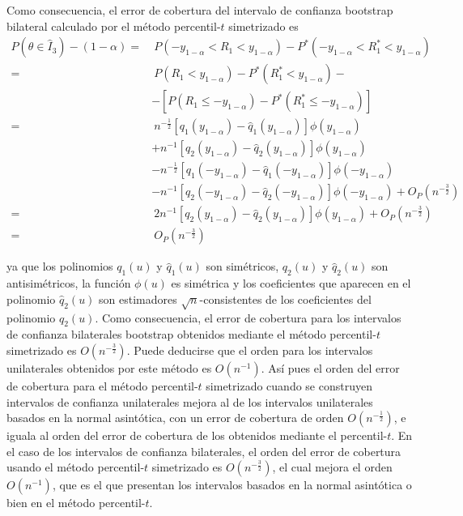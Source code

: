 \documentclass[]{book}
\theoremstyle{definition}
\theoremstyle{definition}
\theoremstyle{definition}
\theoremstyle{remark}
\begin{document}
Como consecuencia, el error de cobertura del intervalo de confianza
bootstrap bilateral calculado por el método percentil-\(t\) simetrizado
es \[\begin{aligned}
P\left( \theta \in \hat{I}_3 \right) -\left( 1-\alpha \right) 
=&\ P\left(-y_{1-\alpha }<R_1<y_{1-\alpha } \right) -P^{\ast}\left( -y_{1-\alpha
}<R_1^{\ast}<y_{1-\alpha } \right) \\
=&\ P\left( R_1<y_{1-\alpha } \right) -P^{\ast}\left( R_1^{\ast
}<y_{1-\alpha } \right) - \\
&-\left[ P\left( R_1\leq -y_{1-\alpha } \right) -P^{\ast}\left( R_1^{\ast
}\leq -y_{1-\alpha } \right) \right] \\
=&\ n^{-\frac{1}{2}}\left[ q_1\left( y_{1-\alpha } \right) -\hat{q}_1\left(
y_{1-\alpha } \right) \right] \phi \left( y_{1-\alpha } \right) \\
&+n^{-1}\left[ q_2\left( y_{1-\alpha } \right) -\hat{q}_2\left(
y_{1-\alpha } \right) \right] \phi \left( y_{1-\alpha } \right) \\
&-n^{-\frac{1}{2}}\left[ q_1\left( -y_{1-\alpha } \right) -\hat{q}_1\left(
-y_{1-\alpha } \right) \right] \phi \left( -y_{1-\alpha } \right) \\
&-n^{-1}\left[ q_2\left( -y_{1-\alpha } \right) -\hat{q}_2\left(
-y_{1-\alpha } \right) \right] \phi \left( -y_{1-\alpha } \right) +O_{P}\left(
n^{-\frac{3}{2}} \right) \\
=&\ 2n^{-1}\left[ q_2\left( y_{1-\alpha } \right) -\hat{q}_2\left(
y_{1-\alpha } \right) \right] \phi \left( y_{1-\alpha } \right) +O_{P}\left(
n^{-\frac{3}{2}} \right) \\
=&\ O_{P}\left( n^{-\frac{3}{2}} \right)
\end{aligned}\]

ya que los polinomios \(q_1\left( u \right)\) y
\(\hat{q}_1\left( u \right)\) son simétricos, \(q_2\left( u \right)\) y
\(\hat{q}_2\left( u \right)\) son antisimétricos, la función
\(\phi \left( u \right)\) es simétrica y los coeficientes que aparecen
en el polinomio \(\hat{q}_2\left( u \right)\) son estimadores
\(\sqrt{n}\)-consistentes de los coeficientes del polinomio
\(q_2\left( u \right)\). Como consecuencia, el error de cobertura para
los intervalos de confianza bilaterales bootstrap obtenidos mediante el
método percentil-\(t\) simetrizado es
\(O\left( n^{-\frac{3}{2}} \right)\). Puede deducirse que el orden para
los intervalos unilaterales obtenidos por este método es
\(O\left( n^{-1} \right)\). Así pues el orden del error de cobertura
para el método percentil-\(t\) simetrizado cuando se construyen
intervalos de confianza unilaterales mejora al de los intervalos
unilaterales basados en la normal asintótica, con un error de cobertura
de orden \(O\left( n^{-\frac{1}{2}} \right)\), e iguala al orden del
error de cobertura de los obtenidos mediante el percentil-\(t\). En el
caso de los intervalos de confianza bilaterales, el orden del error de
cobertura usando el método percentil-\(t\) simetrizado es
\(O\left( n^{-\frac{3}{2}} \right)\), el cual mejora el orden
\(O\left( n^{-1} \right)\), que es el que presentan los intervalos
basados en la normal asintótica o bien en el método percentil-\(t\).
\end{document}
